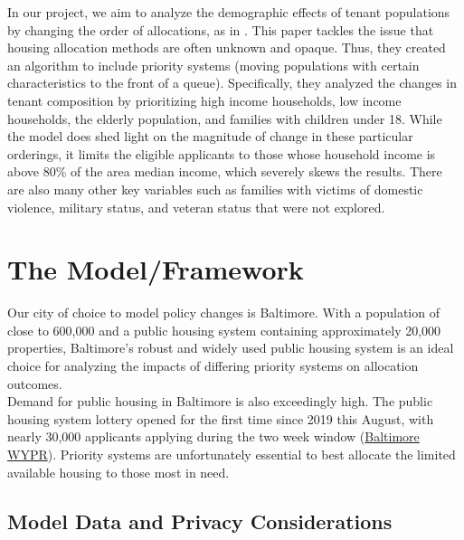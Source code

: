 \documentclass[11pt]{article}
\begin{document}
\newline
In our project, we aim to analyze the demographic effects of tenant populations by changing the order of allocations, as in \cite{nyuaffordablehousing}. This paper tackles the issue that housing allocation methods are often unknown and opaque. Thus, they created an algorithm to include priority systems (moving populations with certain characteristics to the front of a queue). Specifically, they analyzed the changes in tenant composition by prioritizing high income households, low income households, the elderly population, and families with children under 18. While the model does shed light on the magnitude of change in these particular orderings, it limits the eligible applicants to those whose household income is above 80\% of the area median income, which severely skews the results. There are also many other key variables such as families with victims of domestic violence, military status, and veteran status that were not explored.\\


\newpage
\section{The Model/Framework}
\noindent
Our city of choice to model policy changes is Baltimore. With a population of close to 600,000 and a public housing system containing approximately 20,000 properties, Baltimore's robust and widely used public housing system is an ideal choice for analyzing the impacts of differing priority systems on allocation outcomes. \\
\newline
Demand for public housing in Baltimore is also exceedingly high. The public housing system lottery opened for the first time since 2019 this August, with nearly 30,000 applicants applying during the two week window (\href{https://www.wypr.org/wypr-news/2023-08-14/28-000-apply-for-baltimore-city-housing-wait-list-two-week-window-ends-tonight}{Baltimore WYPR}). Priority systems are unfortunately essential to best allocate the limited available housing to those most in need. \\
\newline

\subsection{Model Data and Privacy Considerations}
\end{document}
